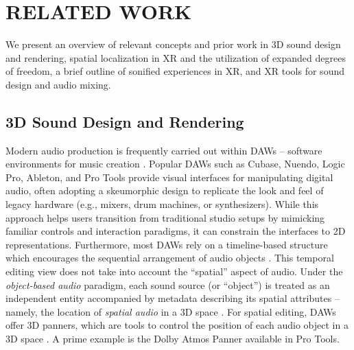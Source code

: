 \section{RELATED WORK}
We present an overview of relevant concepts and prior work in 3D sound design and rendering, spatial localization in XR and the utilization of expanded degrees of freedom, a brief outline of sonified experiences in XR, and XR tools for sound design and audio mixing.

\subsection{3D Sound Design and Rendering}

Modern audio production is frequently carried out within DAWs -- software environments for music creation \cite{marrington2017composing}. Popular DAWs such as Cubase, Nuendo, Logic Pro, Ableton, and Pro Tools provide visual interfaces for manipulating %
digital audio, often adopting a skeumorphic design to replicate the look and feel of legacy hardware (e.g., mixers, drum machines, or synthesizers). While this approach helps users transition from traditional studio setups by mimicking familiar controls and interaction paradigms, it can constrain the interfaces to 2D representations. Furthermore, most DAWs rely on a timeline-based structure which encourages the sequential arrangement of audio objects \cite{marrington2017composing}. This temporal editing view does not take into account the \enquote{spatial} aspect of audio. Under the \emph{object-based audio} paradigm, each sound source (or \enquote{object}) is treated as an independent entity accompanied by metadata describing its spatial attributes -- namely, the location of \emph{spatial audio} in a 3D space \cite{presence1997, begault19943}. For spatial editing, DAWs offer 3D panners, which are tools to control the position of each audio object in a 3D space \cite{mathew:hal-01517188, apple2024logicpro}. A prime example is the Dolby Atmos Panner available in Pro Tools. 

